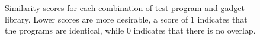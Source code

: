     \begin{figure}[t]
        \vspace{-50pt}
        \caption[Graph of variation between generated programs]
        {Similarity scores for each combination of test program and gadget
        library. Lower scores are more desirable, a score of $1$ indicates that
        the programs are identical, while $0$ indicates that there is no
        overlap.}
        \label{tab:results-different}
    \end{figure}

